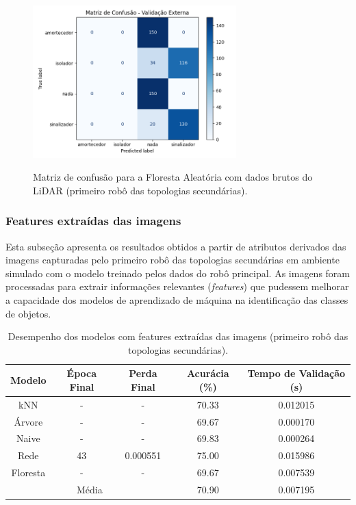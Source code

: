 \begin{figure}[H]
\centering
\caption{Matriz de confusão para a Floresta Aleatória com dados brutos do LiDAR (primeiro robô das topologias secundárias).}
\includegraphics[width=0.7\textwidth]{figuras/Resultados/multi_primeiro_Teste2_rf.png}
\label{fig:mc_lidar_rf_robo1_t2}
\fonte{}
\end{figure}

\subsubsection{Features extraídas das imagens}

Esta subseção apresenta os resultados obtidos a partir de atributos derivados das imagens  capturadas pelo primeiro robô das topologias secundárias em ambiente simulado com o modelo treinado pelos dados do robô principal. As imagens foram processadas para extrair informações relevantes (\textit{features}) que pudessem melhorar a capacidade dos modelos de aprendizado de máquina na identificação das classes de objetos.

\begin{table}[H]
\caption{Desempenho dos modelos com features extraídas das imagens (primeiro robô das topologias secundárias).}
\centering
\begin{tabular}{ccccc}
\hline
\textbf{Modelo} & \textbf{Época Final} & \textbf{Perda Final} & \textbf{Acurácia (\%)} & \textbf{Tempo de Validação (s)}  \\
\hline
kNN      & - & - & 70.33 & 0.012015 \\
Árvore   & - & - & 69.67 & 0.000170 \\
Naive    & - & - & 69.83 & 0.000264 \\
Rede     & 43 & 0.000551 & 75.00 & 0.015986 \\
Floresta & - & - & 69.67 & 0.007539 \\
\hline
\multicolumn{3}{c}{Média} & 70.90 & 0.007195 \\
\hline
\end{tabular}
\fonte{}
\label{tab:modelos_feat_imagens_robo1}
\end{table}


